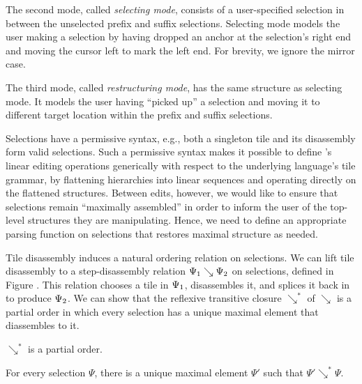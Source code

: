 The second mode, called \emph{selecting mode},
consists of a user-specified selection in between
the unselected prefix and suffix selections.
Selecting mode models the user making a selection by
having dropped
an anchor at the selection's right end and moving
the cursor left to mark the left end.
For brevity, we ignore the mirror case.

The third mode, called \emph{restructuring mode},
has the same structure as selecting mode.
It models the user having ``picked up'' a selection
and moving it to different target location within the
prefix and suffix selections.


Selections have a permissive syntax, e.g., both
a singleton tile and its disassembly form valid selections.
Such a permissive syntax makes it possible to define
\ty's linear editing operations generically with
respect to the underlying language's tile grammar,
by flattening hierarchies into linear sequences and
operating directly on the flattened structures.
Between edits, however, we would like to ensure
that selections remain ``maximally assembled'' in order
to inform the user of the top-level structures they
are manipulating.
Hence, we need to define an appropriate parsing function
on selections that restores maximal structure as needed.

Tile disassembly induces a natural ordering relation
on selections.
We can lift tile disassembly to a step-disassembly relation
$\Psi_1 \searrow \Psi_2$
on selections, defined
in Figure .
This relation chooses a tile in $\Psi_1$, disassembles
it, and splices it back in to produce $\Psi_2$.
We can show that the reflexive transitive closure
$\searrow^*$ of $\searrow$ is a partial order in
which every selection has a unique maximal element
that diassembles to it.

\begin{lemma}
  $\searrow^*$ is a partial order.
\end{lemma}

\begin{lemma}\label{lemma:unique-parsed-selection}
  For every selection $\Psi$, there is a unique maximal
  element $\Psi'$ such that $\Psi'\searrow^*\Psi$.
\end{lemma}

